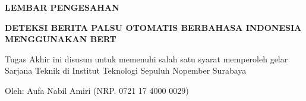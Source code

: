 \begin{center}
  \large
  \textbf{LEMBAR PENGESAHAN}
\end{center}

\thispagestyle{empty}

\begin{center}
  \textbf{DETEKSI BERITA PALSU OTOMATIS BERBAHASA INDONESIA MENGGUNAKAN BERT}
\end{center}

\begingroup
\small

\begin{center}
  Tugas Akhir ini disusun untuk memenuhi salah satu syarat memperoleh gelar Sarjana Teknik di Institut Teknologi Sepuluh Nopember Surabaya

\end{center}

\begin{center}
  Oleh: Aufa Nabil Amiri (NRP. 0721 17 4000 0029)
\end{center}

\begingroup
\setlength{\tabcolsep}{0pt}
\set

